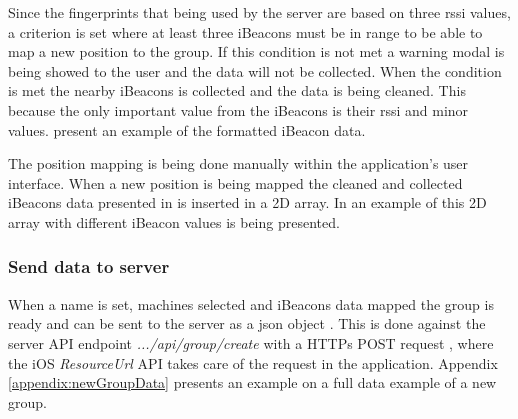 \bigskip

Since the fingerprints that being used by the server are based on three \acrshort{rssi} values, a criterion is set where at least three iBeacons must be in range to be able to map a new position to the group.
If this condition is not met a warning modal is being showed to the user and the data will not be collected.
When the condition is met the nearby iBeacons is collected and the data is being cleaned.
This because the only important value from the iBeacons is their \acrshort{rssi} and minor values.
 present an example of the formatted iBeacon data.


The position mapping is being done manually within the application's user interface.
When a new position is being mapped the cleaned and collected iBeacons data presented in  is inserted in a 2D array.
In  an example of this 2D array with different iBeacon values is being presented.

\subsubsection{Send data to server}\label{sec:implAppnewGroupSend}
When a name is set, machines selected and iBeacons data mapped the group is ready and can be sent to the server as a \acrfull{json} object \cite{IntroducingJSON}.
This is done against the server API endpoint \textit{.../api/group/create} with a HTTPs POST request \cite{POSTHTTPMDN}, where the iOS \textit{ResourceUrl} API \cite{ResourceURLAppleDeveloper} takes care of the request in the application.
Appendix \ref{appendix:newGroupData} presents an example on a full data example of a new group.
